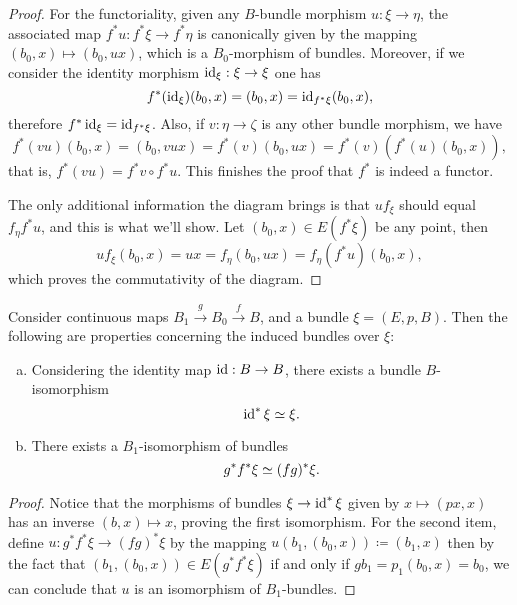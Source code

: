\documentclass[../../../deep-dive]{subfile}
\begin{document}
\begin{proof}
    For the functoriality, given any \(B\)-bundle morphism \(u: \xi \to \eta\), the
    associated map \(f^{*} u: f^{*} \xi \to f^{*} \eta\) is canonically given by the
    mapping \((b_0, x) \mapsto (b_0, u x)\), which is a \(B_0\)-morphism of
    bundles. Moreover, if we consider the identity morphism \(\operatorname{id}_{\xi}: \xi \to
    \xi\) one has
    \[
        f^{*}(\operatorname{id}_{\xi})(b_0, x) = (b_0, x) = \operatorname{id}_{f^{*} \xi}(b_0, x),
    \]
    therefore \(f^{*} \operatorname{id}_{\xi} = \operatorname{id}_{f^{*} \xi}\). Also, if \(v: \eta \to \zeta\)
    is any other bundle morphism, we have
    \[
        f^{*}(v u)(b_0, x)
        = (b_0, v u x)
        = f^{*}(v)(b_0, u x)
        = f^{*}(v)(f^{*}(u)(b_0, x)),
    \]
    that is, \(f^{*}(v u) = f^{*} v \circ f^{*} u\). This finishes the proof that
    \(f^{*}\) is indeed a functor.

    The only additional information the diagram brings is that \(u f_{\xi}\) should
    equal \(f_{\eta} f^{*} u\), and this is what we'll show. Let \((b_0, x) \in
    E(f^{*} \xi)\) be any point, then
    \[
        u f_{\xi} (b_0, x)
        = u x
        = f_{\eta}(b_0, u x)
        = f_{\eta} (f^{*} u) (b_0, x),
    \]
    which proves the commutativity of the diagram.
\end{proof}

\begin{proposition}
    \label{prop:induced-bundle-functorial-transitivity}
    Consider continuous maps \(B_1 \xrightarrow g B_0 \xrightarrow f B\), and a
    bundle \(\xi = (E, p, B)\). Then the following are properties concerning the
    induced bundles over \(\xi\):
    \begin{enumerate}[(a)]\setlength\itemsep{0em}
        \item Considering the identity map \(\operatorname{id}: B \to B\), there exists a bundle
              \(B\)-isomorphism
              \[
                  \operatorname{id}^{*} \xi \simeq \xi.
              \]

        \item There exists a \(B_1\)-isomorphism of bundles
              \[
                  g^{*} f^{*} \xi \simeq (f g)^{*} \xi.
              \]
    \end{enumerate}
\end{proposition}

\begin{proof}
    Notice that the morphisms of bundles \(\xi \to \operatorname{id}^{*} \xi\) given by
    \(x \mapsto (p x, x)\) has an inverse \((b, x) \mapsto x\), proving the first
    isomorphism. For the second item, define
    \(u: g^{*} f^{*} \xi \to (f g)^{*} \xi\) by the mapping
    \(u(b_1, (b_0, x)) \coloneq (b_1, x)\) then by the fact that
    \((b_1, (b_0, x)) \in E (g^{*} f^{*} \xi)\) if and only if
    \(g b_1 = p_1(b_0, x) = b_0\), we can conclude that \(u\) is an isomorphism of
    \(B_1\)-bundles.
\end{proof}
\end{document}
